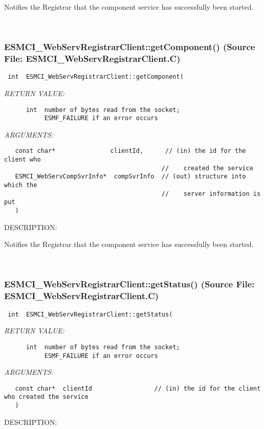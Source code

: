      Notifies the Registrar that the component service has successfully
      been started.
   
 
\mbox{}\hrulefill\
 
\subsubsection{ESMCI\_WebServRegistrarClient::getComponent() (Source File: ESMCI\_WebServRegistrarClient.C)}


  
\begin{verbatim} int  ESMCI_WebServRegistrarClient::getComponent(\end{verbatim}{\em RETURN VALUE:}
\begin{verbatim}      int  number of bytes read from the socket;
           ESMF_FAILURE if an error occurs\end{verbatim}{\em ARGUMENTS:}
\begin{verbatim}   const char*               clientId,      // (in) the id for the client who
                                           //    created the service
   ESMCI_WebServCompSvrInfo*  compSvrInfo  // (out) structure into which the
                                           //    server information is put
   )\end{verbatim}
{\sf DESCRIPTION:\\ }


      Notifies the Registrar that the component service has successfully
      been started.
   
 
\mbox{}\hrulefill\
 
\subsubsection{ESMCI\_WebServRegistrarClient::getStatus() (Source File: ESMCI\_WebServRegistrarClient.C)}


  
\begin{verbatim} int  ESMCI_WebServRegistrarClient::getStatus(\end{verbatim}{\em RETURN VALUE:}
\begin{verbatim}      int  number of bytes read from the socket;
           ESMF_FAILURE if an error occurs\end{verbatim}{\em ARGUMENTS:}
\begin{verbatim}   const char*  clientId                 // (in) the id for the client who created the service
   )\end{verbatim}
{\sf DESCRIPTION:\\ }


